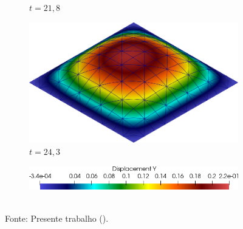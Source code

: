 \begin{figure}[h!]
\begin{subfigure}[b]{0.35\textwidth}
        \caption{$t=21,8$}
    \end{subfigure}
    \begin{subfigure}[b]{0.35\textwidth}
        \centering
        \includegraphics[width=.9\linewidth]{Figuras/FSI-Cavity3D/d24-3.png}
        \caption{$t=24,3$}
    \end{subfigure}
    \begin{subfigure}[b]{0.5\textwidth}
        \centering
        \includegraphics[width=\linewidth]{Figuras/FSI-Cavity3D/ld.png}
    \end{subfigure}
    \\Fonte: Presente trabalho (\the\year).
    \label{fig:Cavity3D-time}
\end{figure}

